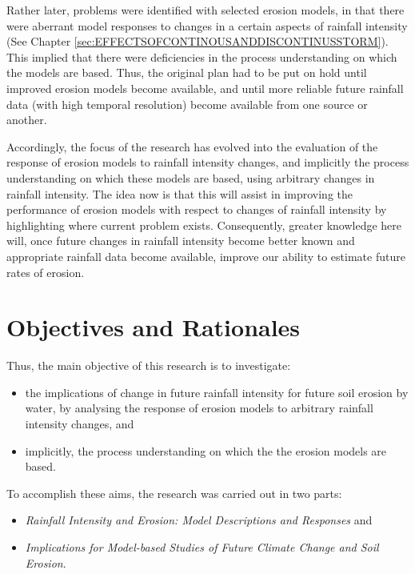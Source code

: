 Rather later, problems were identified with selected erosion models, in
that there were aberrant model responses to changes in a certain aspects of
rainfall intensity (See Chapter
\ref{sec:EFFECTSOFCONTINOUSANDDISCONTINUSSTORM}). This implied that there were
deficiencies in the process understanding on which the models are based. Thus,
the original plan had to be put on hold until improved erosion models become
available, and until more reliable future rainfall data (with high temporal
resolution) become available from one source or another.

Accordingly, the focus of the research has evolved into the evaluation of the
response of erosion models to rainfall intensity changes, and implicitly the
process understanding on which these models are based, using arbitrary changes
in rainfall intensity. The idea now is that this will assist in
improving the performance of
erosion models with respect to changes of rainfall intensity by highlighting
where current problem exists. Consequently, greater knowledge here will,
once future changes in rainfall intensity become better known and appropriate
rainfall data become available, improve our ability to estimate future rates of
erosion.

\section{Objectives and Rationales}
\label{sec:ResearchObjectives}

Thus, the main objective of this research is to investigate:
\begin{itemize}
 \item the implications of change in future rainfall intensity for future soil
erosion by water, by analysing the response of erosion models to arbitrary
rainfall intensity changes, and
 \item implicitly, the process understanding on which the the erosion models are
based.
\end{itemize}
To accomplish these aims, the research was carried out in two parts:
\begin{itemize}
 \item \textit{Rainfall Intensity and Erosion: Model Descriptions and
Responses} and
 \item \textit{Implications for Model-based Studies of Future Climate Change and
Soil Erosion}.
\end{itemize}

